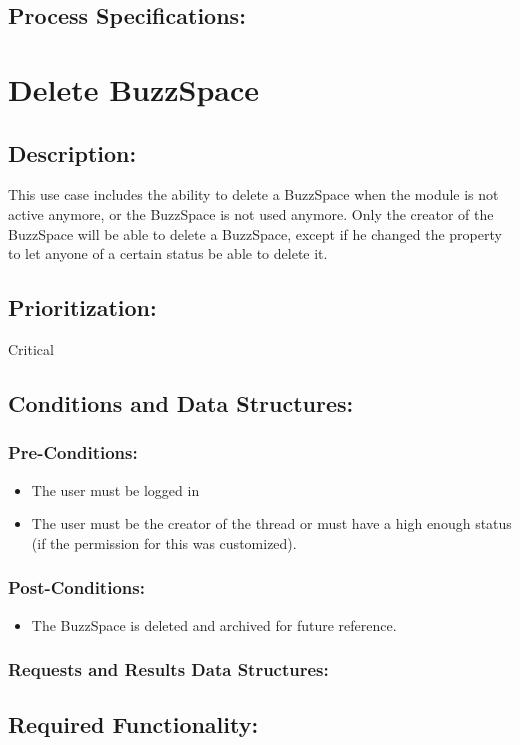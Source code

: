 \documentclass[a4paper,11pt]{article}
\begin{document}
\subsection{Process Specifications:} 

\section{Delete BuzzSpace}
\subsection*{Description:}This use case includes the ability to delete a BuzzSpace when the module is not active anymore, or the BuzzSpace is not used anymore. Only the creator of the 
BuzzSpace will be able to delete a BuzzSpace, except if he changed the property to let anyone of a certain status be able to delete it.
\subsection{Prioritization:} Critical
\subsection{Conditions and Data Structures:}
\subsubsection*{Pre-Conditions:}
\begin{itemize}
	\item The user must be logged in
	\item The user must be the creator of the thread or must have a high enough status (if the permission for this was customized).
\end{itemize}
\subsubsection*{Post-Conditions:}
\begin{itemize}
	\item The BuzzSpace is deleted and archived for future reference. 
\end{itemize}
\subsubsection*{Requests and Results Data Structures:}
\subsection{Required Functionality:} 
\end{document}
